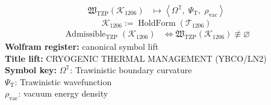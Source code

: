 \noindent
\begin{minipage}[t]{0.48\linewidth}
\begingroup
\small
\[
\begin{aligned}
\mathfrak{W}_{\mathrm{TZP}}\!\left(\mathcal{K}_{1206}\right)
&\longmapsto
\left\langle \Omega^{\mathbb{T}},\; \Psi_{\mathrm{T}},\; \rho_{\mathrm{vac}} \right\rangle
\end{aligned}
\]
\[
\mathcal{K}_{1206}
:=
\operatorname{HoldForm}\!\left(\mathcal{T}_{1206}\right)
\]
\[
\begin{aligned}
\operatorname{Admissible}_{\mathrm{TZP}}\!\left(\mathcal{K}_{1206}\right)
&\Longleftrightarrow
\mathfrak{W}_{\mathrm{TZP}}\!\left(\mathcal{K}_{1206}\right)\not\equiv\varnothing
\end{aligned}
\]
\textbf{Wolfram register:} canonical symbol lift\\
\textbf{Title lift:} CRYOGENIC THERMAL MANAGEMENT (YBCO/LN2)\\
\textbf{Symbol key:} \(\Omega^{\mathbb{T}}\): Trawinistic boundary curvature\\ \(\Psi_{\mathrm{T}}\): Trawinistic wavefunction\\ \(\rho_{\mathrm{vac}}\): vacuum energy density
\par
\endgroup
\end{minipage}\hfill
